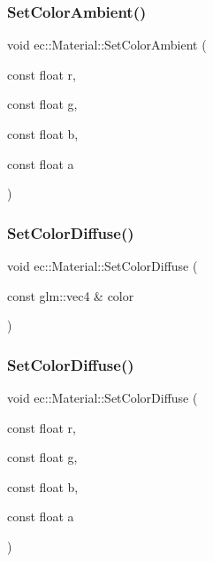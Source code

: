 \subsubsection{\texorpdfstring{Set\+Color\+Ambient()}{SetColorAmbient()}\hspace{0.1cm}{\footnotesize\ttfamily [2/2]}}
{\footnotesize\ttfamily void ec\+::\+Material\+::\+Set\+Color\+Ambient (\begin{DoxyParamCaption}\item[{const float}]{r,  }\item[{const float}]{g,  }\item[{const float}]{b,  }\item[{const float}]{a }\end{DoxyParamCaption})}

\mbox{\label{classec_1_1_material_a7ce5e2fb141bc7901233cc1c37c2a99e}} 
\subsubsection{\texorpdfstring{Set\+Color\+Diffuse()}{SetColorDiffuse()}\hspace{0.1cm}{\footnotesize\ttfamily [1/2]}}
{\footnotesize\ttfamily void ec\+::\+Material\+::\+Set\+Color\+Diffuse (\begin{DoxyParamCaption}\item[{const glm\+::vec4 \&}]{color }\end{DoxyParamCaption})}

\mbox{\label{classec_1_1_material_a62a19bc4ff8b910f46bd55742278635c}} 
\subsubsection{\texorpdfstring{Set\+Color\+Diffuse()}{SetColorDiffuse()}\hspace{0.1cm}{\footnotesize\ttfamily [2/2]}}
{\footnotesize\ttfamily void ec\+::\+Material\+::\+Set\+Color\+Diffuse (\begin{DoxyParamCaption}\item[{const float}]{r,  }\item[{const float}]{g,  }\item[{const float}]{b,  }\item[{const float}]{a }\end{DoxyParamCaption})}

